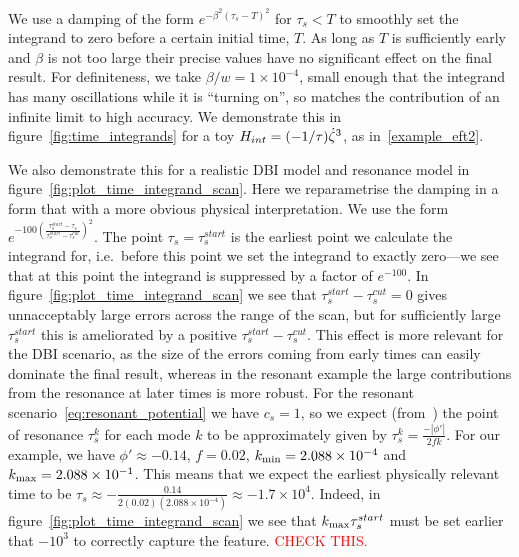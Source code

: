 We use a damping of the form $e^{-\beta^2{(\tau_s-T)}^2}$ for $\tau_s<T$ to smoothly
set the integrand to zero before a certain initial time, $T$.
As long as $T$ is sufficiently early and $\beta$ is not too large
their precise values have no significant effect on the final result.
For definiteness, we take $\beta/w=1\times10^{-4}$, small enough that
the integrand has many oscillations while it is ``turning on'',
so matches the contribution of an infinite limit to high accuracy.
We demonstrate this in figure~\ref{fig:time_integrands}
for a toy $H_{int}=(-1/\tau)\dot{\zeta}^3$,
as in~\eqref{example_eft2}.


We also demonstrate this for a realistic DBI model and resonance model
in figure~\ref{fig:plot_time_integrand_scan}.
Here we reparametrise the damping in a form that with a more obvious physical
interpretation.
We use the form $e^{-100{\left(\frac{{\tau_s^{start}-\tau_s}}{\tau_s^{start}-\tau_s^{cut}}\right)}^2}$.
The point $\tau_s=\tau_s^{start}$ is the earliest point we calculate the integrand for,
i.e.\ before this point we set the integrand to exactly zero---we
see that at this point the integrand is suppressed by a factor of $e^{-100}$.
In figure~\ref{fig:plot_time_integrand_scan} we see that $\tau_s^{start}-\tau_s^{cut}=0$
gives unnacceptably large errors across the range of the scan, but for sufficiently large
$\tau_s^{start}$ this is ameliorated by a positive $\tau_s^{start}-\tau_s^{cut}$.
This effect is more relevant for the DBI scenario, as the size of the errors coming
from early times can easily dominate the final result, whereas in the resonant example
the large contributions from the resonance at later times is more robust.
For the resonant scenario~\eqref{eq:resonant_potential} we have $c_s=1$,
so we expect (from~\cite{flauger_pajer_resonant}) the point of resonance $\tau^k_s$
for each mode $k$ to be approximately given by $\tau^k_s = \frac{-\left|\phi'\right|}{2fk}$.
For our example, we have $\phi'\approx-0.14$, $f=0.02$, ${k_\text{min}}=2.088\times10^{-4}$ and ${k_\text{max}}=2.088\times10^{-1}$.
This means that we expect the earliest physically relevant time to be
$\tau_s\approx-\frac{0.14}{2(0.02)(2.088\times10^{-4})}\approx-1.7\times10^{4}$.
Indeed, in figure~\ref{fig:plot_time_integrand_scan} we see that ${k_\text{max}}\tau_s^{start}$ must be
set earlier that $-10^3$ to correctly capture the feature.
\textcolor{red}{CHECK THIS.}


